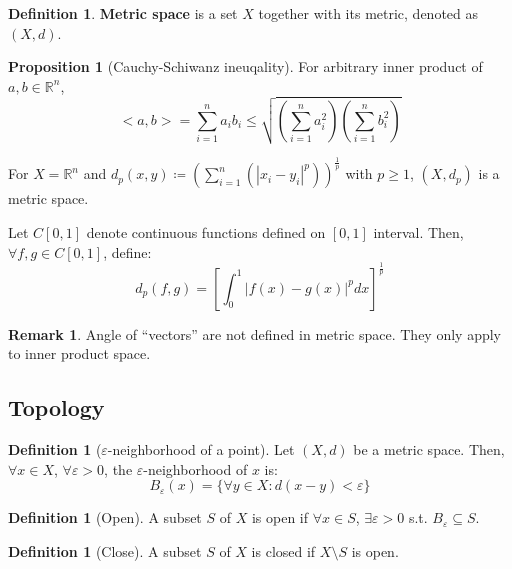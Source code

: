 \documentclass[12pt]{article}
\newcommand{\R}{{\mathbb R}}
\theoremstyle{definition}
\newtheorem{definition}[theorem]{Definition}
\newtheorem{proposition}[theorem]{Proposition}
\newtheorem{remark}[theorem]{Remark}
\theoremstyle{plain}
\begin{document}
\begin{definition}
    \textbf{Metric space} is a set $X$ together with its metric, denoted as $(X,
    d)$.
\end{definition}

\begin{proposition}
    [Cauchy-Schiwanz ineuqality]
    For arbitrary inner product of $a,b \in \R^n$,
    \[
        <a,b> =  \sum_{i=1}^n a_i b_i \le \sqrt{\left( \sum_{i=1}^n a_i^2
        \right) \left( \sum_{i=1}^n b_i^2 \right)}
    \]
\end{proposition}

\begin{example}
    [Metric spaces in $\R^n$]
    For $X = \R^n$ and $d_p(x,y) \coloneqq
    \left( \sum_{i=1}^n (|x_i - y_i|^p) \right)^\frac{1}{p}$ with $p \ge 1$,
    $(X, d_p)$ is a metric space.
\end{example}

\begin{example}
    [Metric space for $X$ = a set of continuous fucntions]
    Let $C[0,1]$ denote continuous functions defined on $[0,1]$ interval. Then,
    $\forall f,g \in C[0,1]$, define:
    \[
        d_p (f,g) = \left[ \int_{0}^{1}|f(x) - g(x)|^p dx
        \right]^\frac{1}{p}
    \]
\end{example}

\begin{remark}
    Angle of ``vectors'' are not defined in metric space. They only apply to
    inner product space.
\end{remark}


\subsection{Topology}
\setcounter{theorem}{0}

\begin{definition}
    [$\varepsilon$-neighborhood of a point]
    Let $(X,d)$ be a metric space. Then, $\forall x \in X$, $\forall \varepsilon
    > 0$, the $\varepsilon$-neighborhood of $x$ is:
    \[
        B_\varepsilon(x) = \{ \forall y \in X: d(x-y) < \varepsilon \}
    \]
\end{definition}

\begin{definition}
    [Open]
    A subset $S$ of $X$ is open if $\forall x \in S$, $\exists \varepsilon >  0$
    s.t. $B_\varepsilon \subseteq S$.
\end{definition}

\begin{definition}
    [Close]
    A subset $S$ of $X$ is closed if $X \setminus S$ is open.
\end{definition}
\end{document}
